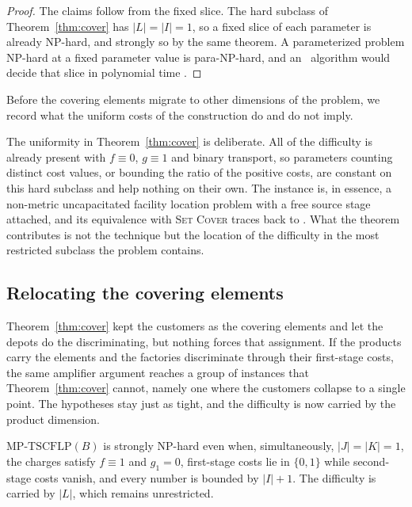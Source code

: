\begin{proof}
The claims follow from the fixed slice. The hard subclass of
Theorem~\ref{thm:cover} has $|L|=|I|=1$, so a fixed
slice of each parameter is already NP-hard, and strongly so by the
same theorem. A parameterized problem
NP-hard at a fixed parameter value is para-NP-hard, and an \XP\ algorithm
would decide that slice in polynomial time \citep{DowneyFellows2013}.
\end{proof}

Before the covering elements migrate to other dimensions of the problem,
we record what the uniform costs of the construction do and do not imply.

\begin{remark}\label{rem:ufl}
The uniformity in Theorem~\ref{thm:cover} is deliberate. All of the
difficulty is already present with $f\equiv 0$, $g\equiv 1$ and binary
transport, so parameters counting distinct cost values, or bounding the ratio of the
positive costs, are constant on this hard subclass and help nothing on
their own. The instance is, in essence, a
non-metric uncapacitated facility location problem with a free source
stage attached, and its equivalence with \textsc{Set Cover} traces back
to \citet{Hochbaum1982}. What the theorem contributes is not the
technique but the location of the difficulty in the most restricted
subclass the problem contains.
\end{remark}

\subsection{Relocating the covering elements}\label{sec:products}

Theorem~\ref{thm:cover} kept the customers as the covering elements and
let the depots do the discriminating, but nothing forces that assignment.
If the products carry the elements and the factories discriminate through
their first-stage costs, the same amplifier argument reaches a group of
instances that Theorem~\ref{thm:cover} cannot, namely one where the
customers collapse to a single point. The hypotheses stay just as tight,
and the difficulty is now carried by the product dimension.

\begin{theorem}\label{thm:products}
$\mathrm{MP\text{-}TSCFLP}(B)$ is strongly NP-hard even when,
simultaneously, $|J|=|K|=1$, the charges satisfy $f\equiv 1$ and $g_1=0$,
first-stage costs lie in $\{0,1\}$ while second-stage costs vanish, and
every number is bounded by $|I|+1$.
The difficulty is carried by $|L|$, which remains unrestricted.
\end{theorem}

